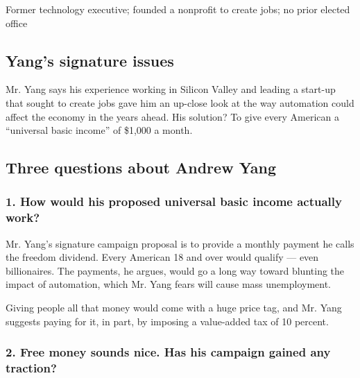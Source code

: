 Former technology executive; founded a nonprofit to create jobs; no
prior elected office

\hypertarget{yangs-signature-issues}{%
\subsection{Yang's signature issues}\label{yangs-signature-issues}}

Mr. Yang says his experience working in Silicon Valley and leading a
start-up that sought to create jobs gave him an up-close look at the way
automation could affect the economy in the years ahead. His solution? To
give every American a ``universal basic income'' of \$1,000 a month.

\hypertarget{three-questions-about-andrew-yang}{%
\subsection{Three questions about Andrew
Yang}\label{three-questions-about-andrew-yang}}

\hypertarget{1-how-would-his-proposed-universal-basic-income-actually-work}{%
\subsubsection{\texorpdfstring{\textbf{1. How would his proposed
universal basic income actually
work?}}{1. How would his proposed universal basic income actually work?}}\label{1-how-would-his-proposed-universal-basic-income-actually-work}}

Mr. Yang's signature campaign proposal is to provide a monthly payment
he calls the freedom dividend. Every American 18 and over would qualify
--- even billionaires. The payments, he argues, would go a long way
toward blunting the impact of automation, which Mr. Yang fears will
cause mass unemployment.

Giving people all that money would come with a huge price tag, and Mr.
Yang suggests paying for it, in part, by imposing a value-added tax of
10 percent.

\hypertarget{2-free-money-sounds-nice-has-his-campaign-gained-any-traction}{%
\subsubsection{\texorpdfstring{\textbf{2. Free money sounds nice. Has
his campaign gained any
traction?}}{2. Free money sounds nice. Has his campaign gained any traction?}}\label{2-free-money-sounds-nice-has-his-campaign-gained-any-traction}}

